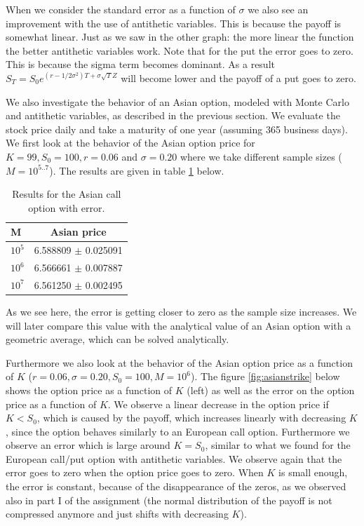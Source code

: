 \documentclass[11pt,a4paper]{article}
\begin{document}
When we consider the standard error as a function of $\sigma$ we also see an improvement with the use of antithetic variables. This is because the payoff is somewhat linear. Just as we saw in the other graph: the more linear the function the better antithetic variables work. Note that for the put the error goes to zero. This is because the sigma term becomes dominant. As a result $S_T=S_0e^{(r-1/2\sigma^2)T+\sigma\sqrt{T}Z}$ will become lower and the payoff of a put goes to zero.

We also investigate the behavior of an Asian option, modeled with Monte Carlo and antithetic variables, as described in the previous section. We evaluate the stock price daily and take a maturity of one year (assuming 365 business days). We first look at the behavior of the Asian option price for $K = 99, S_0 = 100, r = 0.06$ and $\sigma = 0.20$ where we take different sample sizes ($M = 10^{5..7}$). The results are given in table \ref{tab:asian} below.

\begin{table}[H]
  \centering
  \begin{tabular}{l || c }
    \hline
    M & Asian price \\
    \hline
    $10^5$ & 6.588809 $\pm$ 0.025091 \\
    $10^6$ & 6.566661 $\pm$ 0.007887 \\
    $10^7$ & 6.561250 $\pm$ 0.002495 \\
  \end{tabular}
  \caption{Results for the Asian call option with error.}
  \label{tab:asian}
\end{table}

As we see here, the error is getting closer to zero as the sample size increases. We will later compare this value with the analytical value of an Asian option with a geometric average, which can be solved analytically.

Furthermore we also look at the behavior of the Asian option price as a function of $K$ ($r = 0.06, \sigma = 0.20, S_0 = 100, M = 10^6$). The figure \ref{fig:asianstrike} below shows the option price as a function of $K$ (left) as well as the error on the option price as a function of $K$. We observe a linear decrease in the option price if $K < S_0$, which is caused by the payoff, which increases linearly with decreasing $K$, since the option behaves similarly to an European call option. Furthermore we observe an error which is large around $K = S_0$, similar to what we found for the European call/put option with antithetic variables. We observe again that the error goes to zero when the option price goes to zero. When $K$ is small enough, the error is constant, because of the disappearance of the zeros, as we observed also in part I of the assignment (the normal distribution of the payoff is not compressed anymore and just shifts with decreasing $K$).
\end{document}
